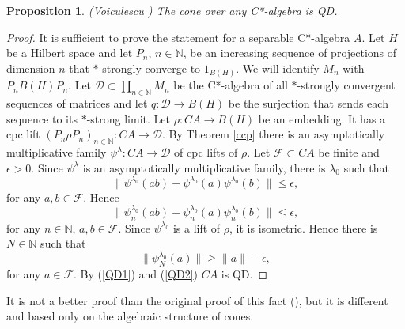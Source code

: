 \documentclass{article}%
\newtheorem{proposition}[theorem]{Proposition}
\begin{document}
\begin{proposition}\label{Voiculescu} (Voiculescu \cite{Voiculescu}) The cone over any C*-algebra is QD.
\end{proposition}
\begin{proof}   It is sufficient to prove the statement for a separable C*-algebra $A$.  Let $H$ be a Hilbert space and let $P_{n}$, $n \in \mathbb N$,  be an increasing sequence of projections of dimension $n$ that $\ast$-strongly converge to $1_{B(H)}$. We will identify $M_{n}$ with $P_{n} B(H) P_{n}$.
Let $\mathcal D \subset \prod_{n\in \mathbb N} M_{n}$ be the C*-algebra of all $\ast$-strongly convergent sequences of matrices and let $q: \mathcal D \to B(H)$ be the surjection that sends each sequence  to its $\ast$-strong limit.
   Let $\rho: CA \to B(H)$ be an embedding. It has a cpc lift $\left(P_n\rho P_n\right)_{n\in \mathbb N}: CA \to \mathcal D$.
By Theorem \ref{ccp} there is an asymptotically multiplicative family $\psi^{\lambda}: CA \to \mathcal D$ of cpc lifts of $\rho$. Let $\mathcal F \subset CA$ be finite and $\epsilon >0$. Since $\psi^{\lambda}$ is an asymptotically multiplicative family, there is $\lambda_0$  such that
\begin{equation} \|\psi^{\lambda_0}(ab) - \psi^{\lambda_0}(a)\psi^{\lambda_0}(b)\|\le \epsilon, \end{equation} for any
$a, b \in \mathcal F$. Hence
\begin{equation}\label{QD1} \|\psi_n^{\lambda_0}(ab) - \psi_n^{\lambda_0}(a)\psi_n^{\lambda_0}(b)\|\le \epsilon, \end{equation} for any
$n\in \mathbb N$, $a, b \in \mathcal F$.
Since $\psi^{\lambda_0}$ is a lift of $\rho$, it is isometric. Hence there is $N\in \mathbb N$ such that
\begin{equation}\label{QD2} \|\psi_N^{\lambda_0}(a)\|\ge \|a\|- \epsilon,\end{equation} for any $a\in \mathcal F$.
By (\ref{QD1}) and (\ref{QD2}) $CA$ is QD.
\end{proof}


It is not a better proof than the original proof  of this fact (\cite{Voiculescu}), but it is different and  based only on the algebraic structure of cones.
\end{document}
